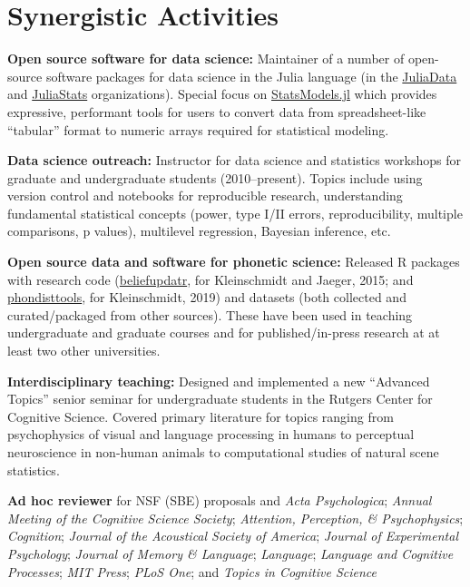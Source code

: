 \documentclass[11pt]{article}
\begin{document}
\section{Synergistic Activities}

\textbf{Open source software for data science:} Maintainer of a number of
open-source software packages for data science in the Julia language (in the
\href{https://github.com/JuliaData/}{JuliaData} and
\href{https://github.com/JuliaStats}{JuliaStats} organizations).  Special focus
on \href{https://github.com/JuliaStats/StatsModels.jl}{StatsModels.jl} which
provides expressive, performant tools for users to convert data from
spreadsheet-like ``tabular'' format to numeric arrays required for statistical
modeling.

\textbf{Data science outreach:} Instructor for data science and statistics
workshops for graduate and undergraduate students (2010--present).  Topics
include using version control and notebooks for reproducible research,
understanding fundamental statistical concepts (power, type I/II errors,
reproducibility, multiple comparisons, p values), multilevel regression,
Bayesian inference, etc.

\textbf{Open source data and software for phonetic science:} Released R packages
with research code
(\href{https://github.com/kleinschmidt/beliefupdatr}{beliefupdatr}, for
Kleinschmidt and Jaeger, 2015; and
\href{https://github.com/kleinschmidt/phondisttools}{phondisttools}, for
Kleinschmidt, 2019) and datasets (both collected and curated/packaged from other
sources).  These have been used in teaching undergraduate and graduate courses
and for published/in-press research at at least two other universities.

\textbf{Interdisciplinary teaching:} Designed and implemented a new ``Advanced
Topics'' senior seminar for undergraduate students in the Rutgers Center for
Cognitive Science.  Covered primary literature for topics ranging from
psychophysics of visual and language processing in humans to perceptual
neuroscience in non-human animals to computational studies of natural scene
statistics.

\textbf{Ad hoc reviewer} for NSF (SBE) proposals and
  \emph{Acta Psychologica};
  \emph{Annual Meeting of the Cognitive Science Society};
  \emph{Attention, Perception, \& Psychophysics};
  \emph{Cognition};
  \emph{Journal of the Acoustical Society of America};
  \emph{Journal of Experimental Psychology};
  \emph{Journal of Memory \& Language};
  \emph{Language};
  \emph{Language and Cognitive Processes};
  \emph{MIT Press};
  \emph{PLoS One}; and
  \emph{Topics in Cognitive Science}
\end{document}
